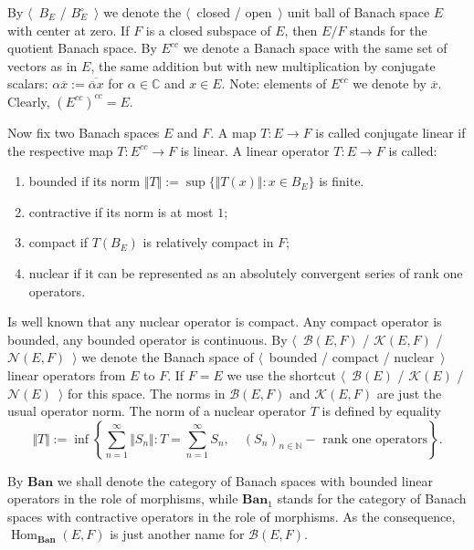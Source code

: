 By $\langle$~$B_E$ / $B_E^\circ$~$\rangle$ we denote the $\langle$~closed /
open~$\rangle$ unit ball of Banach space $E$ with center at zero. If $F$ is a
closed subspace of $E$, then $E/F$ stands for the quotient Banach space. By
$E^{cc}$ we denote a Banach space with the same set of vectors as in $E$, the
same addition but with new multiplication by conjugate scalars:  $\alpha
\overline{x}:=\overline{\overline{\alpha}x}$ for $\alpha\in\mathbb{C}$ 
and $x\in E$. Note: elements of $E^{cc}$ we denote by $\overline{x}$. Clearly,
${(E^{cc})}^{cc}=E$.

Now fix two Banach spaces $E$ and $F$. A map $T:E\to F$ is called conjugate
linear if the respective map $T:E^{cc}\to F$ is linear. A linear operator
$T:E\to F$ is called:
\begin{enumerate}[label = (\roman*)]
  \item bounded if its norm $\Vert T\Vert:=\sup \{\Vert T(x)\Vert:x\in B_E \}$ 
  is finite.

  \item contractive if its norm is at most $1$;

  \item compact if $T(B_E)$ is relatively compact in $F$;

  \item nuclear if it can be represented as an absolutely convergent series of
  rank one operators.
\end{enumerate}

Is well known that any nuclear operator is compact. Any compact operator is
bounded, any bounded operator is continuous. By $\langle$~$\mathcal{B}(E,F)$ /
$\mathcal{K}(E,F)$ / $\mathcal{N}(E,F)$~$\rangle$ we denote the Banach space of
$\langle$~bounded / compact / nuclear~$\rangle$ linear operators from $E$ to
$F$. If $F=E$ we use the shortcut $\langle$~$\mathcal{B}(E)$ / $\mathcal{K}(E)$
/ $\mathcal{N}(E)$~$\rangle$ for this space. The norms in $\mathcal{B}(E,F)$ and
$\mathcal{K}(E,F)$ are just the usual operator norm. The norm of a nuclear
operator $T$ is defined by equality
$$
\Vert T\Vert
:=\inf\left \{
  \sum_{n=1}^\infty\Vert S_n\Vert
  :T=\sum_{n=1}^\infty S_n,\quad 
  {(S_n)}_{n\in\mathbb{N}} - \mbox{ rank one operators}
\right \}.
$$

By $\mathbf{Ban}$ we shall denote the category of Banach spaces with bounded
linear operators in the role of morphisms, while $\mathbf{Ban}_1$ stands for the
category of Banach spaces with contractive operators in the role of morphisms.
As the consequence, $\operatorname{Hom}_{\mathbf{Ban}}(E,F)$ is just another
name for $\mathcal{B}(E,F)$.

